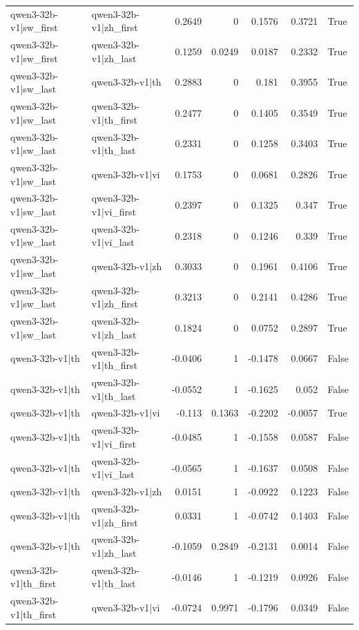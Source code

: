 \begin{table}
\begin{tabular}{l l r r r r l}
qwen3-32b-v1|sw_first & qwen3-32b-v1|zh_first & 0.2649 & 0 & 0.1576 & 0.3721 & True \\
qwen3-32b-v1|sw_first & qwen3-32b-v1|zh_last & 0.1259 & 0.0249 & 0.0187 & 0.2332 & True \\
qwen3-32b-v1|sw_last & qwen3-32b-v1|th & 0.2883 & 0 & 0.181 & 0.3955 & True \\
qwen3-32b-v1|sw_last & qwen3-32b-v1|th_first & 0.2477 & 0 & 0.1405 & 0.3549 & True \\
qwen3-32b-v1|sw_last & qwen3-32b-v1|th_last & 0.2331 & 0 & 0.1258 & 0.3403 & True \\
qwen3-32b-v1|sw_last & qwen3-32b-v1|vi & 0.1753 & 0 & 0.0681 & 0.2826 & True \\
qwen3-32b-v1|sw_last & qwen3-32b-v1|vi_first & 0.2397 & 0 & 0.1325 & 0.347 & True \\
qwen3-32b-v1|sw_last & qwen3-32b-v1|vi_last & 0.2318 & 0 & 0.1246 & 0.339 & True \\
qwen3-32b-v1|sw_last & qwen3-32b-v1|zh & 0.3033 & 0 & 0.1961 & 0.4106 & True \\
qwen3-32b-v1|sw_last & qwen3-32b-v1|zh_first & 0.3213 & 0 & 0.2141 & 0.4286 & True \\
qwen3-32b-v1|sw_last & qwen3-32b-v1|zh_last & 0.1824 & 0 & 0.0752 & 0.2897 & True \\
qwen3-32b-v1|th & qwen3-32b-v1|th_first & -0.0406 & 1 & -0.1478 & 0.0667 & False \\
qwen3-32b-v1|th & qwen3-32b-v1|th_last & -0.0552 & 1 & -0.1625 & 0.052 & False \\
qwen3-32b-v1|th & qwen3-32b-v1|vi & -0.113 & 0.1363 & -0.2202 & -0.0057 & True \\
qwen3-32b-v1|th & qwen3-32b-v1|vi_first & -0.0485 & 1 & -0.1558 & 0.0587 & False \\
qwen3-32b-v1|th & qwen3-32b-v1|vi_last & -0.0565 & 1 & -0.1637 & 0.0508 & False \\
qwen3-32b-v1|th & qwen3-32b-v1|zh & 0.0151 & 1 & -0.0922 & 0.1223 & False \\
qwen3-32b-v1|th & qwen3-32b-v1|zh_first & 0.0331 & 1 & -0.0742 & 0.1403 & False \\
qwen3-32b-v1|th & qwen3-32b-v1|zh_last & -0.1059 & 0.2849 & -0.2131 & 0.0014 & False \\
qwen3-32b-v1|th_first & qwen3-32b-v1|th_last & -0.0146 & 1 & -0.1219 & 0.0926 & False \\
qwen3-32b-v1|th_first & qwen3-32b-v1|vi & -0.0724 & 0.9971 & -0.1796 & 0.0349 & False \\

\end{tabular}
\end{table}
